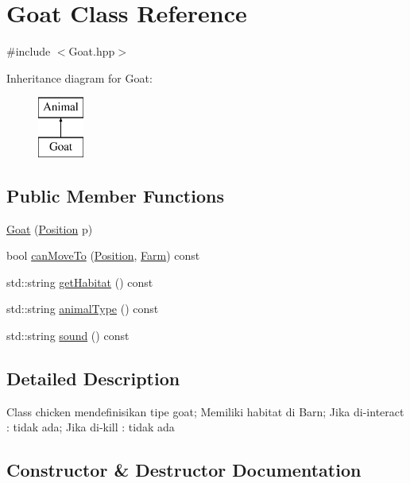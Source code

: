 \hypertarget{class_goat}{}\section{Goat Class Reference}
\label{class_goat}


{\ttfamily \#include $<$Goat.\+hpp$>$}

Inheritance diagram for Goat\+:\begin{figure}[H]
\begin{center}
\leavevmode
\includegraphics[height=2.000000cm]{class_goat}
\end{center}
\end{figure}
\subsection*{Public Member Functions}
\begin{DoxyCompactItemize}
\item 
\mbox{\hyperlink{class_goat_a4c0ffae7ce22c7bc5fa965b912e0f25e}{Goat}} (\mbox{\hyperlink{class_position}{Position}} p)
\item 
bool \mbox{\hyperlink{class_goat_a8c5441c13be5956b4d8381383a2783bb}{can\+Move\+To}} (\mbox{\hyperlink{class_position}{Position}}, \mbox{\hyperlink{class_farm}{Farm}}) const
\item 
std\+::string \mbox{\hyperlink{class_goat_a10f7555af9962fa54783f288cbf47d95}{get\+Habitat}} () const
\item 
std\+::string \mbox{\hyperlink{class_goat_a664be0f59f9504a4f632ae79ac964cf5}{animal\+Type}} () const
\item 
std\+::string \mbox{\hyperlink{class_goat_adfb044fddaba239be655d3f5fa9feb5e}{sound}} () const
\end{DoxyCompactItemize}


\subsection{Detailed Description}
Class chicken mendefinisikan tipe goat; Memiliki habitat di Barn; Jika di-\/interact \+: tidak ada; Jika di-\/kill \+: tidak ada 

\subsection{Constructor \& Destructor Documentation}
\mbox{\label{class_goat_a4c0ffae7ce22c7bc5fa965b912e0f25e}} 
